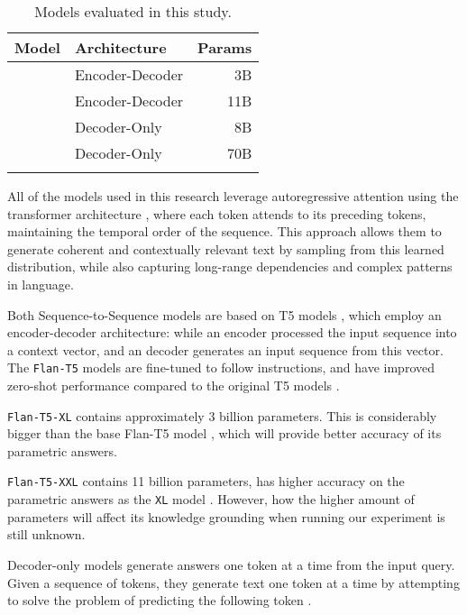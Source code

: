 \begin{table}[b]
	\centering
	\footnotesize
	\begin{tabular}{l l r}
		\toprule
			Model             & Architecture    & Params \\
		\midrule
			\smallflan{}      & Encoder-Decoder & 3B          \\
			\bigflan{}        & Encoder-Decoder & 11B         \\
			\smallllama{}    & Decoder-Only    & 8B          \\
			\bigllama{} & Decoder-Only    & 70B         \\
		\bottomrule \addlinespace[4pt]
	\end{tabular}
	\caption{Models evaluated in this study.}
	\label{model_list}
\end{table}

All of the models used in this research leverage autoregressive attention using the transformer architecture \cite{attention_is_all_you_need}, where each token attends to its preceding tokens, maintaining the temporal order of the sequence.
This approach allows them to generate coherent and contextually relevant text by sampling from this learned distribution, while also capturing long-range dependencies and complex patterns in language.

Both Sequence-to-Sequence models are based on T5 models \cite{t5}, which employ an encoder-decoder architecture: while an encoder processed the input sequence into a context vector, and an decoder generates an input sequence from this vector.
The \texttt{Flan-T5} models are fine-tuned to follow instructions, and have improved zero-shot performance compared to the original T5 models \cite{flant5}.

\texttt{Flan-T5-XL} contains approximately 3 billion parameters.
This is considerably bigger than the base Flan-T5 model \cite{flant5}, which will provide better accuracy of its parametric answers.

\texttt{Flan-T5-XXL} contains 11 billion parameters, has higher accuracy on the parametric answers as the \texttt{XL} model \cite{flant5}.
However, how the higher amount of parameters will affect its knowledge grounding when running our experiment is still unknown.

Decoder-only models generate answers one token at a time from the input query.
Given a sequence of tokens, they generate text one token at a time by attempting to solve the problem of predicting the following token \cite{gpt}.

